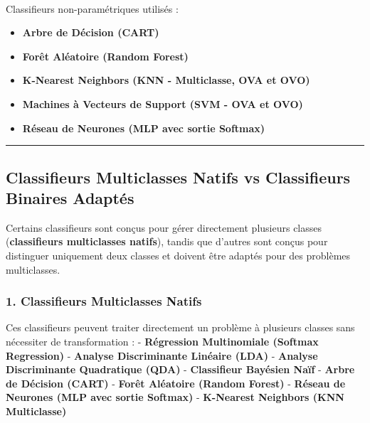 \documentclass[
  letterpaper,
  DIV=11,
  numbers=noendperiod]{scrartcl}
\makeatletter
\let\oldparagraph\paragraph
\renewcommand{\paragraph}{
    \@ifstar
      \xxxParagraphStar
      \xxxParagraphNoStar
  }
\newcommand{\xxxParagraphStar}[1]{\oldparagraph*{#1}\mbox{}}
\newcommand{\xxxParagraphNoStar}[1]{\oldparagraph{#1}\mbox{}}
\providecommand{\tightlist}{%
  \setlength{\itemsep}{0pt}\setlength{\parskip}{0pt}}\usepackage{longtable,booktabs,array}
\makeatother
\begin{document}
\paragraph{Classifieurs non-paramétriques utilisés
:}\label{classifieurs-non-paramuxe9triques-utilisuxe9s}

\begin{itemize}
\tightlist
\item
  \textbf{Arbre de Décision (CART)}
\item
  \textbf{Forêt Aléatoire (Random Forest)}
\item
  \textbf{K-Nearest Neighbors (KNN - Multiclasse, OVA et OVO)}
\item
  \textbf{Machines à Vecteurs de Support (SVM - OVA et OVO)}
\item
  \textbf{Réseau de Neurones (MLP avec sortie Softmax)}
\end{itemize}

\begin{center}\rule{0.5\linewidth}{0.5pt}\end{center}

\subsection{Classifieurs Multiclasses Natifs vs Classifieurs Binaires
Adaptés}\label{classifieurs-multiclasses-natifs-vs-classifieurs-binaires-adaptuxe9s}

Certains classifieurs sont conçus pour gérer directement plusieurs
classes (\textbf{classifieurs multiclasses natifs}), tandis que d'autres
sont conçus pour distinguer uniquement deux classes et doivent être
adaptés pour des problèmes multiclasses.

\subsubsection{1. Classifieurs Multiclasses
Natifs}\label{classifieurs-multiclasses-natifs}

Ces classifieurs peuvent traiter directement un problème à plusieurs
classes sans nécessiter de transformation : - \textbf{Régression
Multinomiale (Softmax Regression)} - \textbf{Analyse Discriminante
Linéaire (LDA)} - \textbf{Analyse Discriminante Quadratique (QDA)} -
\textbf{Classifieur Bayésien Naïf} - \textbf{Arbre de Décision (CART)} -
\textbf{Forêt Aléatoire (Random Forest)} - \textbf{Réseau de Neurones
(MLP avec sortie Softmax)} - \textbf{K-Nearest Neighbors (KNN
Multiclasse)}
\end{document}
